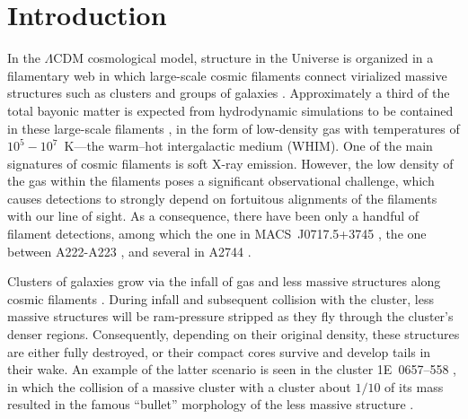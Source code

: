 \section{Introduction}


In the $\Lambda$CDM cosmological model, structure in the Universe is organized in a filamentary web in which large-scale cosmic filaments connect virialized massive structures such as clusters and groups of galaxies \citep[e.g., ][]{Einasto1994}. Approximately a third of the total bayonic matter is expected from hydrodynamic simulations to be contained in these large-scale filaments \citep[e.g.][]{Dave2001}, in the form of low-density gas with temperatures of $10^5-10^7$~K---the warm--hot intergalactic medium (WHIM). One of the main signatures of cosmic filaments is soft X-ray emission. However, the low density of the gas within the filaments poses a significant observational challenge, which causes detections to strongly depend on fortuitous alignments of the filaments with our line of sight. As a consequence, there have been only a handful of filament detections, among which the one in MACS~J0717.5+3745 \citep{Ebeling2004}, the one between A222-A223 \citep{Dietrich2005, Werner2008}, and several in A2744 \citep{Eckert2015}.

Clusters of galaxies grow via the infall of gas and less massive structures along cosmic filaments \citep[e.g.,][]{Springel2006}. During infall and subsequent collision with the cluster, less massive structures will be ram-pressure stripped as they fly through the cluster's denser regions. Consequently, depending on their original density, these structures are either fully destroyed, or their compact cores survive and develop tails in their wake. An example of the latter scenario is seen in the cluster 1E~0657--558 \citep{Elvis1992}, in which the collision of a massive cluster with a cluster about $1/10$ of its mass \citep{Springel2007, Mastropietro2008} resulted in the famous ``bullet'' morphology of the less massive structure \citep{Markevitch2002}.

